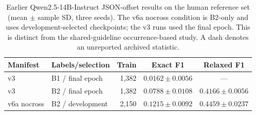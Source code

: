 \begin{table}[htbp]
\caption{Earlier Qwen2.5-14B-Instruct JSON-offset results on the human reference set (mean $\pm$ sample SD, three seeds). The v6a nocross condition is B2-only and uses development-selected checkpoints; the v3 runs used the final epoch. This is distinct from the shared-guideline occurrence-based study. A dash denotes an unreported archived statistic.}
\label{tab:qwen-supplement}
\centering
\small
\begin{tabular}{@{}llrcc@{}}
\toprule
Manifest & Labels/selection & Train & Exact F1 & Relaxed F1 \\
\midrule
v3 & B1 / final epoch & 1,382 & $0.0162\pm0.0056$ & --- \\
v3 & B2 / final epoch & 1,382 & $0.0788\pm0.0108$ & $0.4166\pm0.0056$ \\
v6a nocross & B2 / development & 2,150 & $0.1215\pm0.0092$ & $0.4459\pm0.0237$ \\
\bottomrule
\end{tabular}
\end{table}
